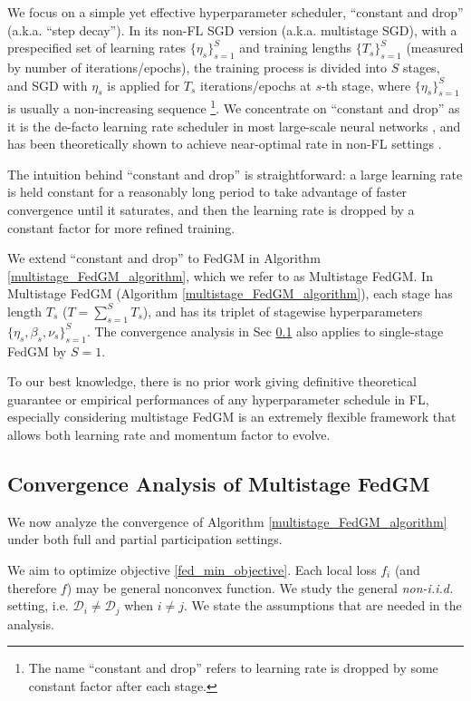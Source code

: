 We focus on a simple yet effective hyperparameter scheduler, ``constant and drop'' (a.k.a. ``step decay''). In its non-FL SGD version (a.k.a. multistage SGD), with a prespecified set of learning rates $\{\eta_s\}_{s=1}^{S}$ and training lengths $\{T_s\}_{s=1}^{S}$ (measured by number of iterations/epochs), the training process is divided into $S$ stages, and SGD with $\eta_s$ is applied for $T_s$ iterations/epochs at $s$-th stage, where $\{\eta_s\}_{s=1}^{S}$ is usually a non-increasing sequence \footnote{The name ``constant and drop'' refers to learning rate is dropped by some constant factor after each stage.}. We concentrate on ``constant and drop'' as it is the de-facto learning rate scheduler in most large-scale neural networks \citep{Krizhevsky12ImageNet,Sutskever13Init,He16Res,Huang2017DenseNet}, and has been theoretically shown to achieve near-optimal rate in non-FL settings \citep{ge19stepdecay,wang21stepdecay}.

The intuition behind ``constant and drop'' is straightforward: a large learning rate is held constant for a reasonably long period to take advantage of faster convergence until it saturates, and then the learning rate is dropped by a constant factor for more refined training.

We extend ``constant and drop'' to FedGM in Algorithm \ref{multistage_FedGM_algorithm}, which we refer to as Multistage FedGM. In Multistage FedGM (Algorithm \ref{multistage_FedGM_algorithm}), each stage has length $T_s$ ($T=\sum_{s=1}^{S}T_s$), and has its triplet of stagewise hyperparameters $\{\eta_s,\beta_s,\nu_s\}_{s=1}^{S}$. The convergence analysis in Sec \ref{subsec:convergence_analysis} also applies to single-stage FedGM by $S=1$.

To our best knowledge, there is no prior work giving definitive theoretical guarantee or empirical performances of any hyperparameter schedule in FL, especially considering multistage FedGM is an extremely flexible framework that allows both learning rate and momentum factor to evolve.


\subsection{Convergence Analysis of Multistage FedGM}
\label{subsec:convergence_analysis}

We now analyze the convergence of Algorithm \ref{multistage_FedGM_algorithm} under both full and partial participation settings. 

We aim to optimize objective \eqref{fed_min_objective}. Each local loss $f_i$ (and therefore $f$) may be general nonconvex function. We study the general \textit{non-i.i.d.} setting, i.e. $\mathcal{D}_i\neq\mathcal{D}_j$ when $i\neq j$. We state the assumptions that are needed in the analysis.

